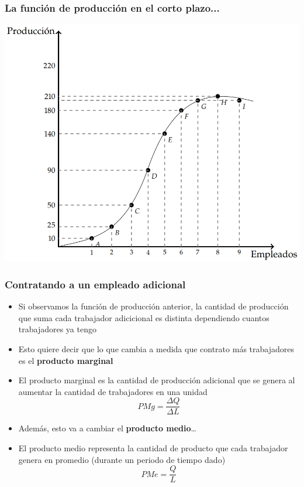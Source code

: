 \documentclass{beamer}
\begin{document}
\begin{frame}
\frametitle{La función de producción en el corto plazo...}
\centering
\includegraphics[scale=0.5]{../Figures/C12.1.png}
\end{frame}

\begin{frame}
    \frametitle{Contratando a un empleado adicional}
    \begin{itemize}
        \item Si observamos la función de producción anterior, la cantidad de producción que suma cada trabajador adicicional es distinta dependiendo cuantos trabajadores ya tengo
        \item Esto quiere decir que lo que cambia a medida que contrato más trabajadores es el \textbf{producto marginal}
        \item El producto marginal es la cantidad de producción adicional que se genera al aumentar la cantidad de trabajadores en una unidad
        \[ PMg = \frac{\Delta Q}{\Delta L} \]
        \item Además, esto va a cambiar el \textbf{producto medio}\dots
        \item El producto medio representa la cantidad de producto que cada trabajador genera en promedio (durante un periodo de tiempo dado)
        \[ PMe = \frac{Q}{L} \]
    \end{itemize}
\end{frame}
\end{document}

